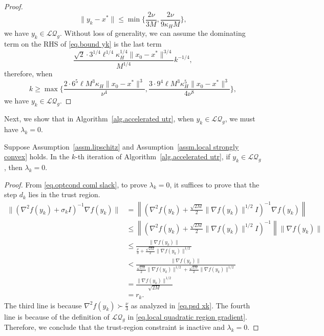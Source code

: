 \documentclass{mcom-l}
\numberwithin{equation}{section}
\begin{document}
\begin{proof}
\begin{equation}
        \|y_k-x^*\|\leq \min\{\frac{2\nu}{3M},\frac{2\nu}{9\kappa_HM}\},
    \end{equation}
    we have $y_k\in\mathcal{LQ}_g$. Without loss of generality, we can assume the dominating term on the RHS of \eqref{eq.bound yk} is the last term
    \begin{equation*}
        \frac{\sqrt{2}\cdot3^{1/4}\ell^{1/4}\kappa_H^{1/4}\|x_0-x^*\|^{3/4}}{M^{1/4}}k^{-1/4},
    \end{equation*}
    therefore, when
    \begin{equation*}
        k\geq \max\{\frac{2\cdot6^5\ell M^3\kappa_H\|x_0-x^*\|^3}{\nu^4},\frac{3\cdot9^4\ell M^3\kappa_H^5\|x_0-x^*\|^3}{4\nu^8}\},
    \end{equation*}
    we have $y_k\in\mathcal{LQ}_g$.
\end{proof}
Next, we show that in Algorithm~\ref{alg.accelerated utr}, when $y_k\in\mathcal{LQ}_g$, we must have $\lambda_k=0$.
\begin{lemma}
    \label{lem.detection of local quadratic}
    Suppose Assumption~\ref{assm.lipschitz} and Assumption~\ref{assm.local strongly convex} holds. In the $k$-th iteration of Algorithm~\ref{alg.accelerated utr}, if $y_k\in\mathcal{LQ}_g$, then $\lambda_k=0$.
\end{lemma}
\begin{proof}
    From \eqref{eq.optcond coml slack}, to prove $\lambda_k=0$, it suffices to prove that the step $d_k$ lies in the trust region.
    \begin{equation*}
        \begin{aligned}
            \|(\nabla^2 f(y_k)+\sigma_k I)^{-1}\nabla f(y_k)\| & = \left\|\left (\nabla^2 f(y_k)+\frac{\sqrt{2M}}{2} \|\nabla f(y_k)\|^{1/2} I\right)^{-1}\nabla f(y_k)\right\|         \\
                                                               & \leq \left\|\left (\nabla^2 f(y_k)+\frac{\sqrt{2M}}{2} \|\nabla f(y_k)\|^{1/2} I\right)^{-1}\right\| \|\nabla f(y_k)\| \\
                                                               & \leq \frac{\|\nabla f(y_k)\|}{\frac{\nu}{3}+\frac{\sqrt{2M}}{2} \|\nabla f(y_k)\|^{1/2}}                               \\
                                                               & <\frac{\|\nabla f(y_k)\|}{\frac{\sqrt{2M}}{2}\|\nabla f(y_k)\|^{1/2}+\frac{\sqrt{2M}}{2} \|\nabla f(y_k)\|^{1/2}}      \\
                                                               & =\frac{\|\nabla f(y_k)\|^{1/2}}{\sqrt{2M}}                                                                             \\
                                                               & =r_k.
        \end{aligned}
    \end{equation*}
    The third line is because $\nabla^2 f(y_k)\succ \frac{\nu}{3}$ as analyzed in \eqref{eq.psd xk}. The fourth line is because of the definition of $\mathcal{LQ}_g$ in \eqref{eq.local quadratic region gradient}. Therefore, we conclude that the trust-region constraint is inactive and $\lambda_k=0$.
\end{proof}
\end{document}
